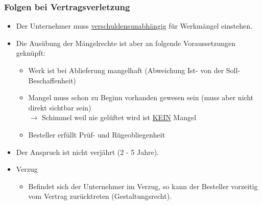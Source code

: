 \subsubsection{Folgen bei Vertragsverletzung}
\begin{itemize}
    \item Der Unternehmer muss \underline{verschuldensunabhängig} für Werkmängel einstehen.
    \item Die Ausübung der Mängelrechte ist aber an folgende Voraussetzungen geknüpft:
    \begin{itemize}
        \item Werk ist bei Ablieferung mangelhaft (Abweichung Ist- von der Soll-Beschaffenheit)
        \item Mangel muss schon zu Beginn vorhanden gewesen sein (muss aber nicht direkt sichtbar sein)\\ $\rightarrow$ Schimmel weil nie gelüftet wird ist \underline{KEIN} Mangel
        \item Besteller erfüllt Prüf- und Rügeobliegenheit
    \end{itemize}
    \item Der Anspruch ist nicht verjährt (2 - 5 Jahre).
    \item Verzug
    \begin{itemize}
        \item  Befindet sich der Unternehmer im Verzug, so kann der Besteller vorzeitig vom Vertrag zurücktreten (Gestaltungsrecht).
    \end{itemize}
\end{itemize}

